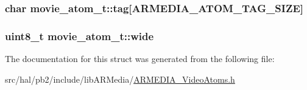 \subsubsection[{\texorpdfstring{tag}{tag}}]{\setlength{\rightskip}{0pt plus 5cm}char movie\+\_\+atom\+\_\+t\+::tag\mbox{[}{\bf A\+R\+M\+E\+D\+I\+A\+\_\+\+A\+T\+O\+M\+\_\+\+T\+A\+G\+\_\+\+S\+I\+ZE}\mbox{]}}\hypertarget{structmovie__atom__t_ad05588847bbd620fb7e82b2ec9b383f8}{}\label{structmovie__atom__t_ad05588847bbd620fb7e82b2ec9b383f8}
\subsubsection[{\texorpdfstring{wide}{wide}}]{\setlength{\rightskip}{0pt plus 5cm}uint8\+\_\+t movie\+\_\+atom\+\_\+t\+::wide}\hypertarget{structmovie__atom__t_a61f422b9f75749cf081a74da955df382}{}\label{structmovie__atom__t_a61f422b9f75749cf081a74da955df382}


The documentation for this struct was generated from the following file\+:\begin{DoxyCompactItemize}
\item 
src/hal/pb2/include/lib\+A\+R\+Media/\hyperlink{_a_r_m_e_d_i_a___video_atoms_8h}{A\+R\+M\+E\+D\+I\+A\+\_\+\+Video\+Atoms.\+h}\end{DoxyCompactItemize}
